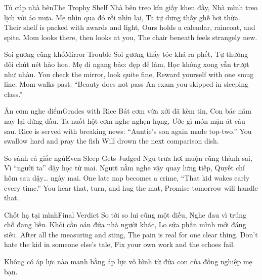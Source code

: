 \begin{tutuyetbox}{Tủ cúp nhà bên}{The Trophy Shelf}
Nhà bên treo kín giấy khen đầy,
Nhà mình treo lịch với áo mưa.
Mẹ nhìn qua đó rồi nhìn lại,
Ta tự dưng thấy ghế hơi thừa.
\tcblower
Their shelf is packed with awards and light,
Ours holds a calendar, raincoat, and spite.
Mom looks there, then looks at you,
The chair beneath feels strangely new.
\end{tutuyetbox}

\begin{tutuyetbox}{Soi gương cũng khổ}{Mirror Trouble}
Soi gương thấy tóc khá ra phết,
Tự thưởng đôi chút nét hào hoa.
Mẹ đi ngang bảo: đẹp để làm,
Học không xong vẫn trượt như nhàu.
\tcblower
You check the mirror, look quite fine,
Reward yourself with one smug line.
Mom walks past: “Beauty does not pass
An exam you skipped in sleeping class.”
\end{tutuyetbox}

\begin{tutuyetbox}{Ăn cơm nghe điểm}{Grades with Rice}
Bát cơm vừa xới đã kèm tin,
Con bác năm nay lại đứng đầu.
Ta nuốt hột cơm nghe nghẹn họng,
Ước gì món mặn át câu sau.
\tcblower
Rice is served with breaking news:
“Auntie's son again made top-two.”
You swallow hard and pray the fish
Will drown the next comparison dish.
\end{tutuyetbox}

\begin{tutuyetbox}{So sánh cả giấc ngủ}{Even Sleep Gets Judged}
Ngủ trưa hơi muộn cũng thành sai,
Vì “người ta” dậy học từ mai.
Ngươi nằm nghe vậy quay lưng tiếp,
Quyết chí hôm sau dậy… ngày mai.
\tcblower
One late nap becomes a crime,
“That kid wakes early every time.”
You hear that, turn, and hug the mat,
Promise tomorrow will handle that.
\end{tutuyetbox}

\begin{tutuyetbox}{Chốt hạ tại mình}{Final Verdict}
So tới so lui cũng một điều,
Nghe đau vì trúng chỗ đang liều.
Khỏi cần oán đứa nhà người khác,
Lo sửa phần mình mới đáng siêu.
\tcblower
After all the measuring and sting,
The pain is real for one clear thing.
Don't hate the kid in someone else's tale,
Fix your own work and the echoes fail.
\end{tutuyetbox}
\begin{ghichu}
Không có áp lực nào mạnh bằng áp lực vô hình từ đứa con của đồng nghiệp mẹ bạn.
\end{ghichu}
